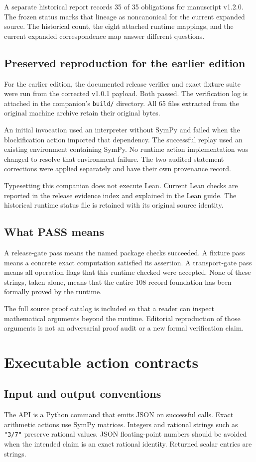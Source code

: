 \documentclass[a4paper,11pt]{article}
\begin{document}
A separate historical report records 35 of 35 obligations for manuscript v1.2.0. The frozen status marks that lineage as noncanonical for the current expanded source. The historical count, the eight attached runtime mappings, and the current expanded correspondence map answer different questions.
\subsection{Preserved reproduction for the earlier edition}
For the earlier edition, the documented release verifier and exact fixture suite were run from the corrected v1.0.1 payload. Both passed. The verification log is attached in the companion's \nolinkurl{build/} directory. All 65 files extracted from the original machine archive retain their original bytes.

An initial invocation used an interpreter without SymPy and failed when the blockification action imported that dependency. The successful replay used an existing environment containing SymPy. No runtime action implementation was changed to resolve that environment failure. The two audited statement corrections were applied separately and have their own provenance record.

Typesetting this companion does not execute Lean. Current Lean checks are reported in the release evidence index and explained in the Lean guide. The historical runtime status file is retained with its original source identity.
\subsection{What PASS means}
A release-gate pass means the named package checks succeeded. A fixture pass means a concrete exact computation satisfied its assertion. A transport-gate pass means all operation flags that this runtime checked were accepted. None of these strings, taken alone, means that the entire 108-record foundation has been formally proved by the runtime.

The full source proof catalog is included so that a reader can inspect mathematical arguments beyond the runtime. Editorial reproduction of those arguments is not an adversarial proof audit or a new formal verification claim.

\section{Executable action contracts}
\subsection{Input and output conventions}
The API is a Python command that emits JSON on successful calls. Exact arithmetic actions use SymPy matrices. Integers and rational strings such as \nolinkurl{"3/7"} preserve rational values. JSON floating-point numbers should be avoided when the intended claim is an exact rational identity. Returned scalar entries are strings.
\end{document}
